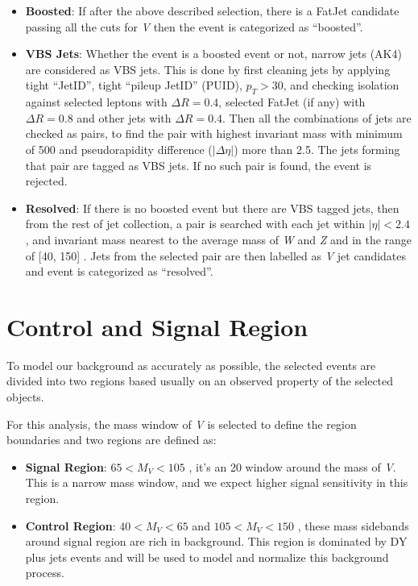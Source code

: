 \begin{itemize}
  \item \textbf{Boosted}: If after the above described selection, there is
        a FatJet candidate passing all the cuts for \textit{V} then the event is
        categorized as ``boosted''.
  \item \textbf{VBS Jets}: Whether the event is a boosted event or not,
        narrow jets (AK4) are considered as VBS jets.
        This is done by first cleaning jets by applying tight ``JetID'',
        tight ``pileup JetID'' (PUID),
        \( p_T > 30 \),
        and checking isolation against selected leptons with \(\Delta R = 0.4\),
        selected FatJet (if any) with \( \Delta R = 0.8 \)
        and other jets with \(\Delta R = 0.4\).
        Then all the combinations of jets are checked as pairs,
        to find the pair with highest invariant mass with minimum of 500 \GeV{}
        and pseudorapidity difference (\( |\Delta \eta| \)) more than 2.5.
        The jets forming that pair are tagged as VBS jets.
        If no such pair is found, the event is rejected.
  \item \textbf{Resolved}: If there is no boosted event but there
        are VBS tagged jets, then from the rest of jet collection, a pair
        is searched with each jet within
        \( |\eta| < 2.4 \), and invariant mass nearest to the average mass of \textit{W} and \textit{Z}
        and in the range of [40, 150] \GeV{}.
        Jets from the selected pair are then labelled as \textit{V} jet candidates
        and event is categorized as ``resolved''.
\end{itemize}

\section{
  Control and Signal Region
 }

To model our background as accurately as possible,
the selected events are divided into two regions based usually on
an observed property of the selected objects.

For this analysis, the mass window of \textit{V} is selected
to define the region boundaries and two regions are defined as:

\begin{itemize}
  \item \textbf{Signal Region}: \( 65 < M_{V} < 105 \) \GeV{},
        it's an 20 \GeV{} window around the mass of \textit{V}. This is a
        narrow mass window, and we expect higher signal sensitivity in this region.
  \item \textbf{Control Region}: \( 40 < M_{V} < 65 \) and \( 105 < M_{V} < 150 \) \GeV{},
        these mass sidebands around signal region are rich
        in background. This region is dominated by \gls{DY} plus jets
        events and will be used to model and normalize this background process.
\end{itemize}


